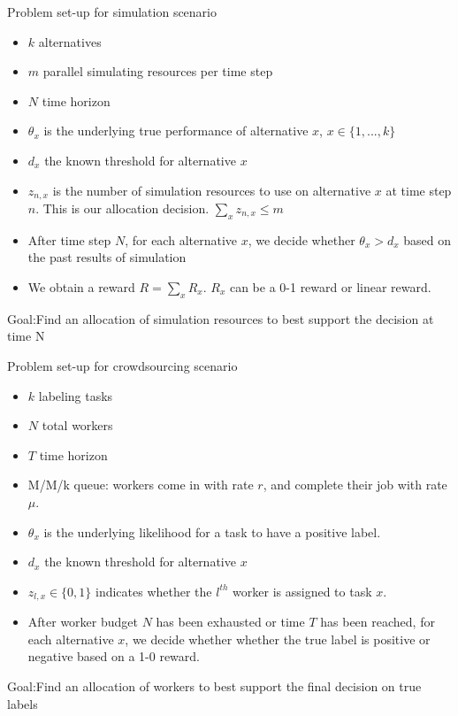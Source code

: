 \documentclass{beamer}
\begin{document}
\begin{frame}{Problem set-up for simulation scenario}

\begin{itemize}
\item $k$ alternatives
\item $m$ parallel simulating resources per time step
\item $N$ time horizon
\item $\theta_x$ is the underlying true performance of alternative $x$, $x\in\{1,...,k\}$
\item $d_x$ the known threshold for alternative $x$
\item $z_{n,x}$ is the number of simulation resources to use on alternative $x$ at time step $n$. This is our allocation decision. $\sum_x z_{n,x}\leq m$
\item After time step $N$, for each alternative $x$, we decide whether $\theta_x>d_x$ based on the past results of simulation
\item We obtain a reward $R = \sum_x R_x$. $R_x$ can be a 0-1 reward or linear reward.
\end{itemize}
{\Large \color{red} Goal:Find an allocation of simulation resources to best support the decision at time N}
\end{frame}

\begin{frame}{Problem set-up for crowdsourcing scenario}

\begin{itemize}
\item $k$ labeling tasks
\item $N$ total workers
\item $T$ time horizon
\item M/M/k queue: workers come in with rate $r$, and complete their job with rate $\mu$.
\item $\theta_x$ is the underlying likelihood for a task to have a positive label.
\item $d_x$ the known threshold for alternative $x$
\item $z_{l,x}\in \{0,1\}$ indicates whether the $l^{th}$ worker is assigned to task $x$.
\item After worker budget $N$ has been exhausted or time $T$ has been reached, for each alternative $x$, we decide whether whether the true label is positive or negative based on a 1-0 reward.
\end{itemize}
{\Large \color{red} Goal:Find an allocation of workers to best support the final decision on true labels}\end{frame}
\end{document}
